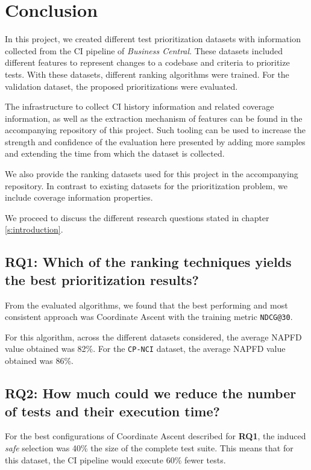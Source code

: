\chapter{Conclusion}

In this project, we created different test prioritization datasets with 
information collected from the CI pipeline of \emph{Business Central}. These datasets included
different features to represent changes to a codebase and criteria to prioritize tests.
With these datasets, different ranking algorithms were trained. For the validation dataset,
the proposed prioritizations were evaluated.

The infrastructure to collect CI history information and related coverage information,
as well as the extraction mechanism of features can be found in the accompanying 
repository of this project. Such tooling can be used to increase the strength and confidence of the 
evaluation here presented by adding more samples and extending 
the time from which the dataset is collected. 

We also provide the ranking datasets used for this project in the 
accompanying repository. In contrast to existing datasets
for the prioritization problem, we include coverage information properties.

We proceed to discuss the different research questions stated in chapter \ref{s:introduction}.

\section{RQ1: Which of the ranking techniques yields the best prioritization results?}
From the evaluated algorithms, we found that the 
best performing and most consistent approach was Coordinate Ascent
with the training metric \texttt{NDCG@30}.

For this algorithm, across the different datasets considered, the average NAPFD value obtained was 82\%.
For the \texttt{CP-NCI} dataset, the average NAPFD value obtained was 86\%.

\section{RQ2: How much could we reduce the number of tests and their execution time?}
For the best configurations of Coordinate Ascent described for \textbf{RQ1},
the induced \emph{safe} selection was 40\% the size of the complete test suite.
This means that for this dataset, the CI pipeline would execute 60\% fewer tests.

